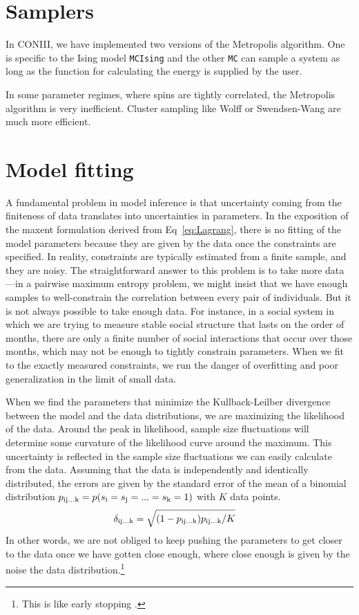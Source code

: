 \documentclass[aps,prl,twocolumn,nofootinbib]{revtex4-1}
\begin{document}
\section{Samplers}
In CONIII, we have implemented two versions of the Metropolis algorithm. One is specific to the Ising model {\tt MCIsing} and the other {\tt MC} can sample a system as long as the function for calculating the energy is supplied by the user.

In some parameter regimes, where spins are tightly correlated, the Metropolis algorithm is very inefficient. Cluster sampling like Wolff or Swendsen-Wang are much more efficient.


\section{Model fitting}
A fundamental problem in model inference is that uncertainty coming
from the finiteness of data translates into uncertainties in parameters.
In the exposition of the maxent formulation derived from Eq~\ref{eq:Lagrang}, there is no fitting of the model parameters because they are given by the data once the constraints are specified. In reality, constraints are typically estimated from a finite sample, and they are noisy.
The straightforward answer to this problem is to take more data---in a pairwise
maximum entropy problem, we might insist that we have enough samples to well-constrain
the correlation between every pair of individuals.  But it is not always possible
to take enough data.  For instance, in a social system in which we are trying to
measure stable social structure that lasts on the order of months, there are only
a finite number of social interactions that occur over those months, which may
not be enough to tightly constrain parameters. When we fit to the exactly measured constraints, we run the danger of overfitting and poor generalization in the limit of small data.

When we find the parameters that minimize the Kullback-Leilber divergence between the model and the data distributions, we are maximizing the likelihood of the data. 
Around the peak in likelihood, sample size fluctuations will determine some curvature of the likelihood curve around the maximum.
This uncertainty is reflected in the sample size fluctuations we can easily calculate from the data. Assuming that the data is independently and identically distributed, the errors are given by the standard error of the mean of a binomial distribution \mbox{$p_{\rm ij...k} = p(s_{\rm i}=s_{\rm j}=...=s_{\rm k}=1)$} with $K$ data points.
\begin{align}
	\delta_{\rm ij...k} &= \sqrt{(1-p_{\rm ij...k})p_{\rm ij...k}/K}
\end{align}
In other words, we are not obliged to keep pushing the parameters to get closer to the data once we have gotten close enough, where close enough is given by the noise the data distribution.\footnote{This is like early stopping \cite{}.}
\end{document}
